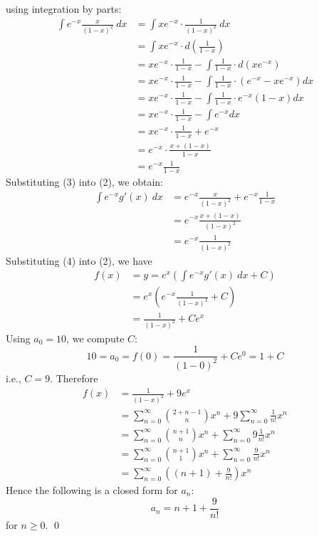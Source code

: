 using integration by parts:
\begin{align*}
\int e^{-x} \frac{x}{(1-x)^2}\ dx
&= \int xe^{-x} \cdot \frac{1}{(1-x)^2} \ dx \\
&= \int xe^{-x} \cdot d \left( \frac{1}{1-x} \right) \\
&= xe^{-x} \cdot \frac{1}{1-x}
   - \int \frac{1}{1-x} \cdot d \left( xe^{-x} \right)
   \\
&= xe^{-x} \cdot \frac{1}{1-x}
   - \int \frac{1}{1-x} \cdot \left( e^{-x} - xe^{-x} \right) dx
   \\
&= xe^{-x} \cdot \frac{1}{1-x}
   - \int \frac{1}{1-x} \cdot e^{-x} \left( 1 - x \right) dx
   \\
&= xe^{-x} \cdot \frac{1}{1-x}
   - \int e^{-x} dx 
   \\
&= xe^{-x} \cdot \frac{1}{1-x}
   + e^{-x}
   \\
&= e^{-x} \cdot \frac{x + (1-x)}{1-x}
   \\
&= e^{-x} \frac{1}{1-x}
\tag{3}
\end{align*}
Substituting (3) into (2),
we obtain:
\begin{align*}
\int e^{-x} g'(x) \ dx
&= e^{-x} \frac{x}{(1-x)^2} 
+ e^{-x} \frac{1}{1-x}
\\
&=  e^{-x} \frac{x + (1-x)}{(1-x)^2}
\\
&=  e^{-x} \frac{1}{(1-x)^2}
\tag{4}
\end{align*}
Substituting (4) into (2), we have
\begin{align*}
f(x)
&= y = e^x \left( \int e^{-x} g'(x) \ dx + C \right) \\
&= e^x \left( e^{-x} \frac{1}{(1-x)^2} + C \right) \\
&= \frac{1}{(1-x)^2} + C e^x
\end{align*}
Using $a_0 = 10$, we compute $C$:
\[
10 = a_0 = f(0) = \frac{1}{(1-0)^2} + C e^{0} = 1 + C
\]
i.e., $C = 9$.
Therefore
\begin{align*}
f(x)
&= \frac{1}{(1-x)^2} + 9 e^{x} \\
&= \sum_{n=0}^\infty \binom{2 + n - 1}{n} x^n
   + 9 \sum_{n=0}^\infty \frac{1}{n!}x^n
   \\
&= \sum_{n=0}^\infty \binom{n+1}{n} x^n
   + \sum_{n=0}^\infty 9 \frac{1}{n!}x^n
   \\
&= \sum_{n=0}^\infty \binom{n+1}{1} x^n
   + \sum_{n=0}^\infty \frac{9}{n!}x^n
   \\
&= \sum_{n=0}^\infty
   \left( (n+1) 
   + \frac{9}{n!} \right)
   x^n
\end{align*}
Hence the following is a closed form for $a_n$:
\[
a_n = n + 1 + \frac{9}{n!}
\]
for $n \geq 0$.
\qed


